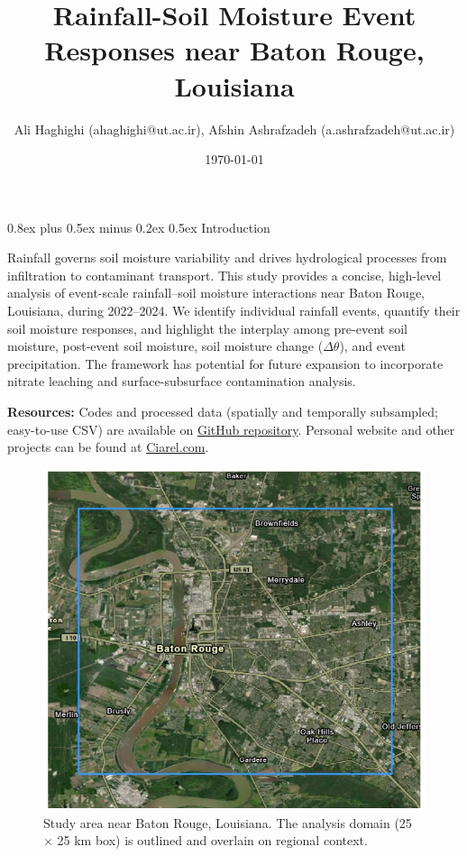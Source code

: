 \documentclass[9pt, twocolumn]{extarticle}
\title{Rainfall-Soil Moisture Event Responses near Baton Rouge, Louisiana}
\author{%
  \large Ali Haghighi \normalsize{(ahaghighi@ut.ac.ir)}\large, Afshin Ashrafzadeh \normalsize{(a.ashrafzadeh@ut.ac.ir)}
}
\date{\large \today}
\makeatletter
\renewcommand\section{\@startsection{section}{1}{0pt}%
  {0.8ex plus 0.5ex minus 0.2ex}%
  {0.5ex}%
  {\normalfont\Large\bfseries}}
\renewcommand{\maketitle}{\bgroup\setlength{\parindent}{0pt}
\vspace*{-\topskip}%
\begin{flushleft}
  \huge\textbf{\@title}

  \vspace{0.20cm}

  \normalsize\@author \hfill \normalsize\@date

  \vspace{0.25cm}\hrule\vspace{0.25cm}
\end{flushleft}
\egroup}
\makeatother
\begin{document}
\twocolumn[
  \begin{@twocolumnfalse}
    \maketitle
  \end{@twocolumnfalse}
]


\section{Introduction}

Rainfall governs soil moisture variability and drives hydrological processes from infiltration to contaminant transport. This study provides a concise, high-level analysis of event-scale rainfall–soil moisture interactions near Baton Rouge, Louisiana, during 2022–2024. We identify individual rainfall events, quantify their soil moisture responses, and highlight the interplay among pre-event soil moisture, post-event soil moisture, soil moisture change ($\Delta \theta$), and event precipitation. The framework has potential for future expansion to incorporate nitrate leaching and surface-subsurface contamination analysis.

\noindent\textbf{Resources: }
Codes and processed data (spatially and temporally subsampled; easy-to-use CSV) are available on \href{https://github.com/Alioax/rainfall-soil-moisture/}{GitHub repository}. 
Personal website and other projects can be found at \href{https://ciarel.com}{Ciarel.com}.

\begin{figure}[!b] %
  \centering
  \includegraphics[width=0.95\columnwidth]{map}
  \caption{Study area near Baton Rouge, Louisiana. The analysis domain (25 $\times$ 25 km box) is outlined and overlain on regional context.}
  \label{fig:map}
\end{figure}
\end{document}
